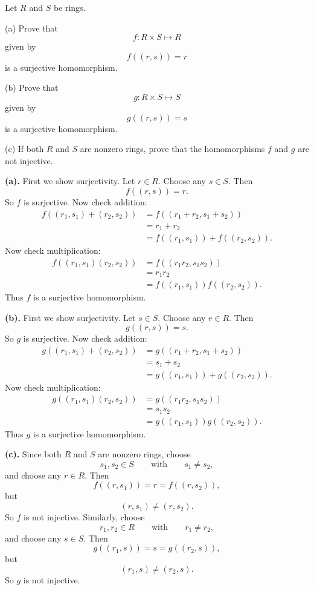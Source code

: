 \begin{problem}{
    Let $R$ and $S$ be rings.

    (a) Prove that
    \[
        f:R\times S\mapsto R
    \]
    given by
    \[
        f((r,s))=r
    \]
    is a surjective homomorphism.

    (b) Prove that
    \[
        g:R\times S\mapsto S
    \]
    given by
    \[
        g((r,s))=s
    \]
    is a surjective homomorphism.

    (c) If both $R$ and $S$ are nonzero rings, prove that the homomorphisms $f$ and $g$ are not injective.
}
    \textbf{(a).}
    First we show surjectivity.
    Let $r\in R$.
    Choose any $s\in S$.
    Then
    \[
        f((r,s))=r.
    \]
    So $f$ is surjective.
    Now check addition:
    \begin{align*}
        f((r_1,s_1)+(r_2,s_2))
        &=
        f((r_1+r_2,s_1+s_2))\\
        &=
        r_1+r_2\\
        &=
        f((r_1,s_1))+f((r_2,s_2)).
    \end{align*}
    Now check multiplication:
    \begin{align*}
        f((r_1,s_1)(r_2,s_2))
        &=
        f((r_{1}r_2,s_{1}s_2))\\
        &=
        r_{1}r_2\\
        &=
        f((r_1,s_1))f((r_2,s_2)).
    \end{align*}
    Thus $f$ is a surjective homomorphism.

    \textbf{(b).}
    First we show surjectivity.
    Let $s\in S$.
    Choose any $r\in R$.
    Then
    \[
        g((r,s))=s.
    \]
    So $g$ is surjective.
    Now check addition:
    \begin{align*}
        g((r_1,s_1)+(r_2,s_2))
        &=
        g((r_1+r_2,s_1+s_2))\\
        &=
        s_1+s_2\\
        &=
        g((r_1,s_1))+g((r_2,s_2)).
    \end{align*}
    Now check multiplication:
    \begin{align*}
        g((r_1,s_1)(r_2,s_2))
        &=
        g((r_{1}r_2,s_{1}s_2))\\
        &=
        s_{1}s_2\\
        &=
        g((r_1,s_1))g((r_2,s_2)).
    \end{align*}
    Thus $g$ is a surjective homomorphism.

    \textbf{(c).}
    Since both $R$ and $S$ are nonzero rings, choose
    \[
        s_1,s_2\in S
        \qquad\text{with}\qquad
        s_1\neq s_2,
    \]
    and choose any $r\in R$.
    Then
    \[
        f((r,s_1))=r=f((r,s_2)),
    \]
    but
    \[
        (r,s_1)\neq (r,s_2).
    \]
    So $f$ is not injective.
    Similarly, choose
    \[
        r_1,r_2\in R
        \qquad\text{with}\qquad
        r_1\neq r_2,
    \]
    and choose any $s\in S$.
    Then
    \[
        g((r_1,s))=s=g((r_2,s)),
    \]
    but
    \[
        (r_1,s)\neq (r_2,s).
    \]
    So $g$ is not injective.
\end{problem}


